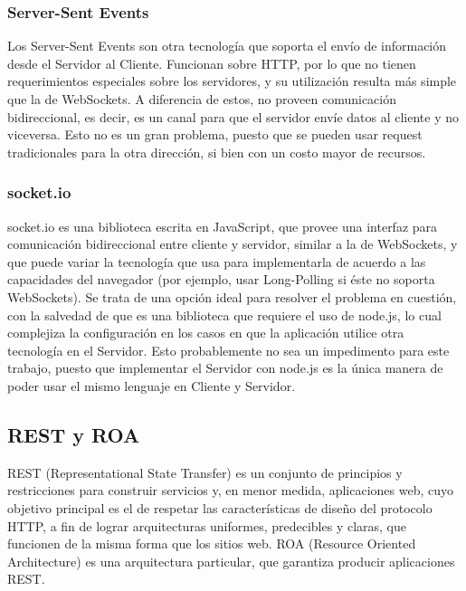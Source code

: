 \documentclass[doc,helv,longtable]{article}
\begin{document}
\subsubsection{Server-Sent Events}
Los Server-Sent Events\cite{sse} son otra tecnología que soporta el envío de información desde el Servidor al Cliente. Funcionan sobre HTTP, por lo que no tienen requerimientos especiales sobre los servidores, y su utilización resulta más simple que la de WebSockets\cite{congress}\cite{wsvssse2}. A diferencia de estos, no proveen comunicación bidireccional, es decir, es un canal para que el servidor envíe datos al cliente y no viceversa. Esto no es un gran problema, puesto que se pueden usar request tradicionales para la otra dirección, si bien con un costo mayor de recursos\cite{ssedownside}.

\subsubsection{socket.io}
socket.io\cite{socketio} es una biblioteca escrita en JavaScript, que provee una interfaz para comunicación bidireccional entre cliente y servidor, similar a la de WebSockets, y que puede variar la tecnología que usa para implementarla de acuerdo a las capacidades del navegador (por ejemplo, usar Long-Polling si éste no soporta WebSockets). Se trata de una opción ideal para resolver el problema en cuestión, con la salvedad de que es una biblioteca que requiere el uso de node.js, lo cual complejiza la configuración en los casos en que la aplicación utilice otra tecnología en el Servidor. Esto probablemente no sea un impedimento para este trabajo, puesto que implementar el Servidor con node.js es la única manera de poder usar el mismo lenguaje en Cliente y Servidor.

\subsection{REST y ROA}
REST (Representational State Transfer) es un conjunto de principios y restricciones para construir servicios y, en menor medida, aplicaciones web, cuyo objetivo principal es el de respetar las características de diseño del protocolo HTTP, a fin de lograr arquitecturas uniformes, predecibles y claras, que funcionen de la misma forma que los sitios web. ROA (Resource Oriented Architecture) es una arquitectura particular, que garantiza producir aplicaciones REST\cite{rest}.
\end{document}
